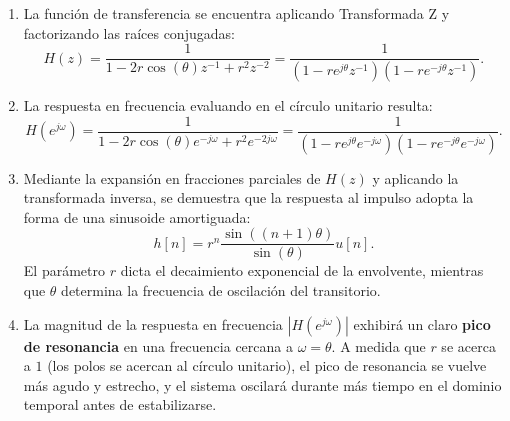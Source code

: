 \begin{enumerate}
	\item La funci\'{o}n de transferencia se encuentra aplicando Transformada Z y factorizando las raíces conjugadas:
	\begin{equation}
		H(z) = \frac{1}{1 - 2r\cos(\theta) z^{-1} + r^{2} z^{-2}} = \frac{1}{(1 - r e^{j\theta} z^{-1})(1 - r e^{-j\theta} z^{-1})}.
	\end{equation}
	
	\item La respuesta en frecuencia evaluando en el círculo unitario resulta:
	\begin{equation}
		H(e^{j\omega}) = \frac{1}{1 - 2r\cos(\theta) e^{-j\omega} + r^{2} e^{-2j\omega}} = \frac{1}{(1 - r e^{j\theta} e^{-j\omega})(1 - r e^{-j\theta} e^{-j\omega})}.
	\end{equation}
	
	\item Mediante la expansión en fracciones parciales de $H(z)$ y aplicando la transformada inversa, se demuestra que la respuesta al impulso adopta la forma de una sinusoide amortiguada:
	\begin{equation}
		h[n] = r^{n} \frac{\sin((n+1)\theta)}{\sin(\theta)} u[n].
	\end{equation}
	El parámetro $r$ dicta el decaimiento exponencial de la envolvente, mientras que $\theta$ determina la frecuencia de oscilación del transitorio.
	
	\item La magnitud de la respuesta en frecuencia $|H(e^{j\omega})|$ exhibirá un claro \textbf{pico de resonancia} en una frecuencia cercana a $\omega = \theta$. A medida que $r$ se acerca a $1$ (los polos se acercan al círculo unitario), el pico de resonancia se vuelve más agudo y estrecho, y el sistema oscilará durante más tiempo en el dominio temporal antes de estabilizarse.
\end{enumerate}